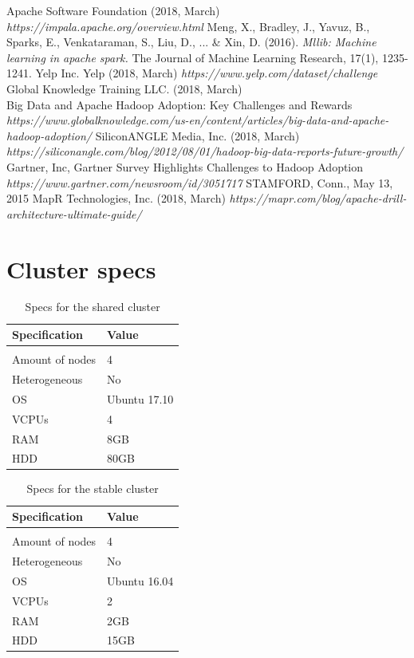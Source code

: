 \documentclass[a4paper,english]{report}
\begin{document}
\begin{thebibliography}{1}
		Apache Software Foundation (2018, March) 
		\emph{https://impala.apache.org/overview.html}
		Meng, X., Bradley, J., Yavuz, B., Sparks, E., Venkataraman, S., Liu, D., ... \& Xin, D. (2016). \emph{Mllib: Machine learning in apache spark.} The Journal of Machine Learning Research, 17(1), 1235-1241.
		 Yelp Inc. Yelp (2018, March)
		\emph{https://www.yelp.com/dataset/challenge}
		 Global Knowledge Training LLC. (2018, March)\\
		 Big Data and Apache Hadoop Adoption: Key Challenges and Rewards
		\emph{https://www.globalknowledge.com/us-en/content/articles/big-data-and-apache-hadoop-adoption/}
		SiliconANGLE Media, Inc. (2018, March)
		\emph{https://siliconangle.com/blog/2012/08/01/hadoop-big-data-reports-future-growth/}
		Gartner, Inc, Gartner Survey Highlights Challenges to Hadoop Adoption
		\emph{https://www.gartner.com/newsroom/id/3051717} STAMFORD, Conn., May 13, 2015
		MapR Technologies, Inc. (2018, March)
		\emph{https://mapr.com/blog/apache-drill-architecture-ultimate-guide/}
	\end{thebibliography}

\appendix
\chapter{Cluster specs}
\begin{table}[ht]
	\centering
	\caption{Specs for the shared cluster}
	\label{table:cluster_shared}
	\begin{tabular}{ll}
		\\
		\multicolumn{1}{l}{\bfseries Specification} & \multicolumn{1}{l}{\bfseries Value} \\ \hline \\
		Amount of nodes & 4  \\
		Heterogeneous & No  \\
		OS & Ubuntu 17.10  \\
		VCPUs & 4  \\
		RAM & 8GB  \\ 
		HDD & 80GB  \\
	\end{tabular}
\end{table}

\begin{table}[ht]
	\centering
	\caption{Specs for the stable cluster}
	\label{table:cluster_stable}
	\begin{tabular}{ll}
		\\
		\multicolumn{1}{l}{\bfseries Specification} & \multicolumn{1}{l}{\bfseries Value} \\ \hline \\
		Amount of nodes & 4  \\
		Heterogeneous & No  \\
		OS & Ubuntu 16.04  \\
		VCPUs & 2  \\
		RAM & 2GB  \\ 
		HDD & 15GB  \\
	\end{tabular}
\end{table}
\end{document}
